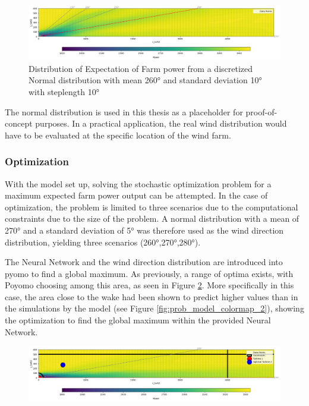 \documentclass[preprint,12pt]{elsarticle}
\begin{document}
\begin{figure}[h] 
	\centering
	\includegraphics[width=1\textwidth]{../figures/optimization/prob_expectation.png} 
	\caption{Distribution of Expectation of Farm power from a discretized Normal distribution with mean 260° and standard deviation 10° with steplength 10°}
	\label{fig:prob_expectation}
\end{figure}


The normal distribution is used in this thesis as a placeholder for proof-of-concept purposes. In a practical application, the real wind distribution would have to be evaluated at the specific location of the wind farm. 

\subsubsection{Optimization}

With the model set up, solving the stochastic optimization problem for a maximum expected farm power output can be attempted. In the case of optimization, the problem is limited to three scenarios due to the computational constraints due to the size of the problem. A normal distribution with a mean of 270° and  a standard deviation of 5° was therefore used as the wind direction distribution, yielding three scenarios (260°,270°,280°).

The Neural Network and the wind direction distribution are introduced into pyomo to find a global maximum. As previously, a range of optima exists, with Poyomo choosing among this area, as seen in Figure \ref{fig:prob_data_lininter}. More specifically in this case, the area close to the wake had been shown to predict higher values than in the simulations by the model (see Figure \ref{fig:prob_model_colormap_2}), showing the optimization to find the global maximum within the provided Neural Network. 

\begin{figure}[h] 
	\centering
	\includegraphics[width=1\textwidth]{../figures/optimization/prob_data_lininter.png} 
	\caption{}
	\label{fig:prob_data_lininter}
\end{figure}
\end{document}
